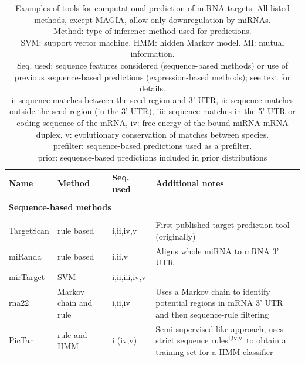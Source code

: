 \begin{table}
  \caption{Examples of tools for computational prediction of miRNA targets. All listed methods,
  except MAGIA, allow only downregulation by miRNAs. \\
  Method: type of inference method used for predictions. \\
  SVM: support vector machine. HMM: hidden Markov model. MI: mutual information. \\
  Seq. used: sequence features considered (sequence-based methods) or use of
  previous sequence-based predictions (expression-based methods); see text for details. \\
  i: sequence matches between the seed region and 3' UTR,
  ii: sequence matches outside the seed region (in the 3' UTR),
  iii: sequence matches in the 5' UTR or coding sequence of the mRNA,
  iv: free energy of the bound miRNA-mRNA duplex,
  v: evolutionary conservation of matches between species. \\
  prefilter: sequence-based predictions used as a prefilter. \\
  prior: sequence-based predictions included in prior distributions
  }
  \label{table:prediction-methods}
  {\fontsize{10pt}{13pt}\selectfont
  \begin{tabular}{ lp{3cm}lp{5cm} }
    \hline
    \textbf{Name} & \textbf{Method} & \textbf{Seq. used} & \textbf{Additional notes} \\
    \hline \\
    \multicolumn{4}{l}{\textbf{Sequence-based methods}} \\
    \\[-.3cm]
    TargetScan \citep{Agarwal2015}  & rule based            & i,ii,iv,v     & First published target prediction tool (originally) \\
    miRanda \citep{Betel2008}       & rule based            & i,ii,v        & Aligns whole miRNA to mRNA 3' UTR \\
    mirTarget \citep{Wang2008}      & SVM                   & i,ii,iii,iv,v &  \\
    rna22 \citep{Miranda2006}       & Markov chain and rule & i,ii,iv       & Uses a Markov chain to identify potential regions in mRNA 3' UTR and then sequence-rule filtering \\
    PicTar \citep{Krek2005}         & rule and HMM          & i (iv,v)      & Semi-supervised-like approach, uses strict sequence rules$^{\textup{i,iv,v}}$ to obtain a training set for a HMM classifier \\

\end{tabular}}
\end{table}
